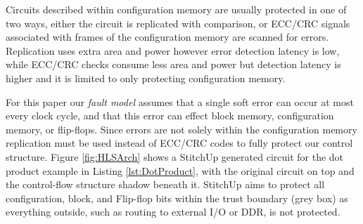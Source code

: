 Circuits described within configuration memory are usually protected in one of two ways,
either the circuit is replicated with comparison, or ECC/CRC signals associated with
frames of the configuration memory are scanned for errors.
Replication uses extra area and power however error detection latency is low,
while ECC/CRC checks consume less area and power but detection latency is higher and
it is limited to only protecting configuration memory.


For this paper our \emph{fault model} assumes that a single soft error
can occur at most every clock cycle, and that this error can effect block memory,
configuration memory, or flip-flops.
Since errors are not solely within the configuration memory replication must be used
instead of ECC/CRC codes to fully protect our control structure.
Figure \ref{fig:HLSArch} shows a StitchUp generated circuit for the dot product 
example in Listing \ref{lst:DotProduct}, with the original circuit on top and the
control-flow structure shadow beneath it.
StitchUp aims to protect all configuration, block, and Flip-flop bits within the
trust boundary (grey box) as everything outside, such as routing to
external I/O or DDR, is not protected.

